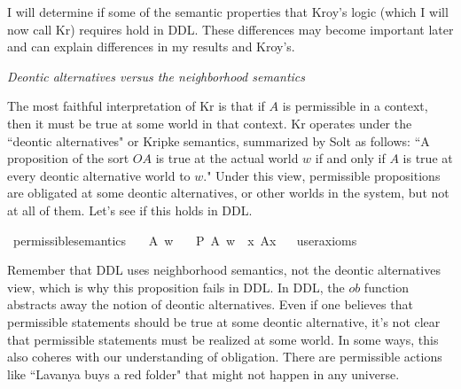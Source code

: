 \begin{isabellebody}
\begin{isamarkuptext}
I will determine if some of the semantic properties that Kroy's logic (which I will now call Kr) requires 
hold in DDL. These differences may become important later and can explain differences in my results and 
Kroy's.%
\end{isamarkuptext}\isamarkuptrue%
%
\emph{Deontic alternatives versus the neighborhood semantics}
%
\begin{isamarkuptext}%
The most faithful interpretation of Kr is that if $A$ is permissible in a context, then 
it must be true at some world in that context. Kr operates under the ``deontic alternatives" or Kripke semantics, 
summarized by Solt \cite{solt} as follows: ``A proposition of the sort $O A$ is true at the actual world $w$ if and
only if $A$ is true at every deontic alternative world to $w$." Under this view, permissible propositions
are obligated at some deontic alternatives, or other worlds in the system, but not at all of them. Let's 
see if this holds in DDL.%
\end{isamarkuptext}\isamarkuptrue%
\isamarkupfalse%
\ permissible{\isacharunderscore}semantics{\isacharcolon}\isanewline
\ \ \ A\ w\isanewline
\ \ \ {\isachardoublequoteopen}{\isacharparenleft}P\ {\isacharbraceleft}A{\isacharbraceright}{\isacharparenright}\ w\ {\isasymlongrightarrow}\ {\isacharparenleft}{\isasymexists}x{\isachardot}\ A{\isacharparenleft}x{\isacharparenright}{\isacharparenright}{\isachardoublequoteclose}\isanewline
\ \ \isamarkupfalse%
{\isacharbrackleft}user{\isacharunderscore}axioms{\isacharbrackright}%
\isadelimproof
\ %
\endisadelimproof
%
\isatagproof
{}\isamarkupfalse%
\isanewline
%
%
\endisatagproof
{\isafoldproof}%
%
\isadelimproof
%
\endisadelimproof
%
\begin{isamarkuptext}%
Remember that DDL uses neighborhood semantics, not the deontic alternatives view, which is why this
 proposition fails in DDL. In DDL, the $ob$ function abstracts away the notion of
 deontic alternatives. Even if one believes that permissible 
statements should be true at some deontic alternative, it's not clear that permissible statements
 must be realized at some world. In some ways, this also coheres with our understanding of obligation. There 
are permissible actions like ``Lavanya buys a red folder" that might not happen in any universe.


\end{isamarkuptext}
\end{isabellebody}
